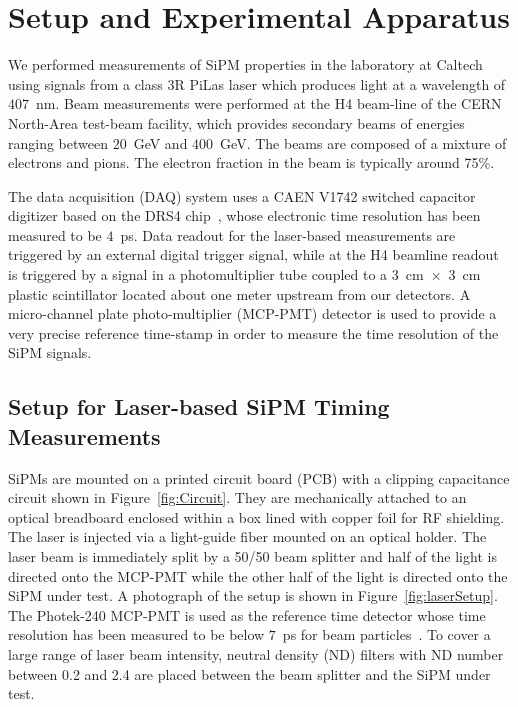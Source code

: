 \section{Setup and Experimental Apparatus }
\label{sec:setup}

We performed measurements of SiPM properties in the laboratory at Caltech using
signals from a class 3R PiLas laser which produces light at a wavelength of
$407$~nm. Beam measurements were performed at the H4 beam-line of the CERN
North-Area test-beam facility, which provides secondary beams of energies
ranging between $20$~GeV and $400$~GeV. The beams are composed of a mixture of
electrons and pions. The electron fraction in the beam is typically around 75\%.

The data acquisition (DAQ) system uses a CAEN V1742 switched capacitor digitizer
based on the DRS4 chip~\cite{DRS4}, whose electronic time resolution has been
measured to be $4$~ps. Data readout for the laser-based measurements are
triggered by an external digital trigger signal, while at the H4 beamline
readout is triggered by a signal in a photomultiplier tube coupled to a
$3$~$\mathrm{cm}$~$\times$~$3$~$\mathrm{cm}$ plastic scintillator located about
one meter upstream from our detectors. A micro-channel plate photo-multiplier
(MCP-PMT) detector is used to provide a very precise reference time-stamp in
order to measure the time resolution of the SiPM signals.

\subsection{Setup for Laser-based SiPM Timing Measurements}

SiPMs are mounted on a printed circuit board (PCB) with a clipping capacitance
circuit shown in Figure~\ref{fig:Circuit}. They are mechanically attached to an
optical breadboard enclosed within a box lined with copper foil for RF
shielding. The laser is injected via a light-guide fiber mounted on an optical
holder. The laser beam is immediately split by a 50/50 beam splitter and half of
the light is directed onto the MCP-PMT while the other half of the light is
directed onto the SiPM under test. A photograph of the setup is shown in
Figure~\ref{fig:laserSetup}. The Photek-240 MCP-PMT is used as the reference
time detector whose time resolution has been measured to be below $7$~ps for
beam particles~\cite{MCPShowerMaxPaper}. To cover a large range of laser beam
intensity, neutral density (ND) filters with ND number between 0.2 and 2.4 are
placed between the beam splitter and the SiPM under test.

